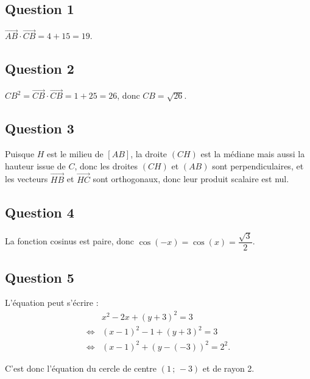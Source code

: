 \subsection*{Question 1}

\(\overrightarrow{AB} \cdot \overrightarrow{CB} = 4 + 15 = 19\).

\subsection*{Question 2}

\(CB^2 = \overrightarrow{CB} \cdot \overrightarrow{CB} = 1 + 25 = 26\), donc \(CB = \sqrt{26}\).

\subsection*{Question 3}

Puisque \( H \) est le milieu de \( [AB] \), la droite \( (CH) \) est la médiane mais aussi la hauteur issue de \( C \), donc les droites \( (CH) \) et \( (AB) \) sont perpendiculaires, et les vecteurs \( \overrightarrow{HB} \) et \( \overrightarrow{HC} \) sont orthogonaux, donc leur produit scalaire est nul.

\subsection*{Question 4}

La fonction cosinus est paire, donc \( \cos(-x) = \cos(x) = \dfrac{\sqrt{3}}{2} \).

\subsection*{Question 5}

L'équation peut s'écrire :
\begin{align*}
&x^2 - 2x + (y + 3)^2 = 3 \\
\iff &(x - 1)^2 - 1 + (y + 3)^2 = 3 \\
\iff &(x - 1)^2 + (y - (-3))^2 = 2^2.
\end{align*}

C'est donc l'équation du cercle de centre \( (1\,;\,-3) \) et de rayon 2.
